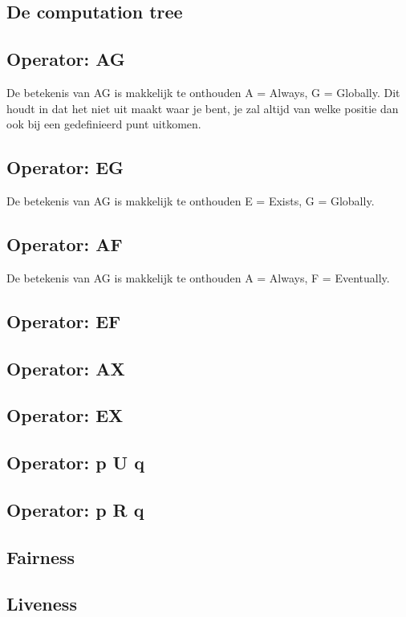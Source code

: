 \documentclass{article}%
\begin{document}
\subsection{De computation tree}

\subsection{Operator: AG}
De betekenis van AG is makkelijk te onthouden A = Always, G = Globally. Dit houdt in dat het niet uit maakt waar je bent, je zal altijd van welke positie dan ook bij een gedefinieerd punt uitkomen.

\subsection{Operator: EG}
De betekenis van AG is makkelijk te onthouden E = Exists, G = Globally.

\subsection{Operator: AF}
De betekenis van AG is makkelijk te onthouden A = Always, F = Eventually.
\subsection{Operator: EF}

\subsection{Operator: AX}

\subsection{Operator: EX}

\subsection{Operator: p U q}

\subsection{Operator: p R q}

\subsection{Fairness}

\subsection{Liveness}

\newpage

\newpage


\end{document}
